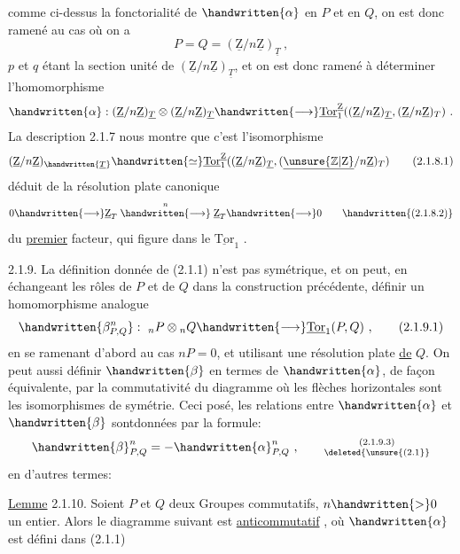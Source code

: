 comme ci-dessus la fonctorialité de $\handwritten{\alpha}$ en $P$ et en $Q$, on est donc ramené au cas où on a 
\[
P=Q=(\underline{\mathrm Z}/n\underline{\mathrm Z})_{\underline{T}}\ ,
\]
$p$ et $q$ étant la section unité de $(\underline{\mathrm Z}/n\underline{\mathrm Z})_{\underline{T}}$, et on est donc ramené à déterminer l'homomorphisme
\[
\handwritten{\alpha}:(\underline{\mathrm Z}/n\underline{\mathrm Z})_{\underline{T}}\otimes(\underline{\mathrm Z}/n\underline{\mathrm Z})_{\underline{T}}\handwritten{\longrightarrow}\underline{\mathrm{Tor}}_1^{\underline{\mathrm Z}}((\underline{\mathrm Z}/n\underline{\mathrm Z})_{\underline{T}},(\underline{\mathrm Z}/n\underline{\mathrm Z})_T)\ .
\]
La description 2.1.7 nous montre que c'est l'isomorphisme
\[
(\underline{\mathrm Z}/n\underline{\mathrm Z})_{\handwritten{\underline T}}\handwritten{\simeq}\underline{\mathrm{Tor}}_1^{\underline{\mathrm Z}}((\underline{\mathrm Z}/n\underline{\mathrm Z})_{\underline{T}},(\underline{\unsure{\mathbb Z|\mathrm Z}}/n\underline{\mathrm Z})_T)\tag*{(2.1.8.1)}
\]
déduit de la résolution plate canonique
\[
0\handwritten{\longrightarrow}\underline{\mathrm Z}_T\mathrel{\mathop{\handwritten{\longrightarrow}}\limits^{n}}\underline{\mathrm Z}_T\handwritten{\longrightarrow}0\tag*{\handwritten{(2.1.8.2)}}
\]
du \uline{premier} facteur,  qui figure dans le $\underline{\mathrm{Tor}}_1$ .

2.1.9. La définition donnée de (2.1.1) n'est pas symétrique, et on peut, en échangeant les rôles de $P$ et de $Q$ dans la construction précédente, définir un homomorphisme analogue
\[
\handwritten{\beta^n_{P,Q}}:\ {}_nP\otimes{}_nQ\handwritten{\longrightarrow}\underline{\mathrm{Tor}}_1(P,Q)\ ,\tag*{(2.1.9.1)}
\]
en se ramenant d'abord au cas $nP=0$, et utilisant une résolution plate \uline{de} $Q$. On peut aussi définir $\handwritten{\beta}$ en termes de $\handwritten{\alpha}$, de façon équivalente, par la commutativité du diagramme
où les flèches horizontales sont les isomorphismes de symétrie. Ceci posé, les relations entre $\handwritten{\alpha}$ et $\handwritten{\beta}$ sont\handwritten{/}données par la formule:
\[
\handwritten{\beta}^{n}_{P,Q}=-{\handwritten{\alpha}}^{n}_{P,Q}\ ,\tag*{\(\substack{\text{(2.1.9.3)}\\\deleted{\text{\unsure{(2.1}}}}\)}
\]
en d'autres termes:

\uline{Lemme} 2.1.10. Soient $P$ et $Q$ deux Groupes commutatifs, $n\handwritten{>}0$ un entier. Alors le diagramme suivant est \uline{anticommutatif} , où $\handwritten{\alpha}$ est défini dans (2.1.1)\handwritten{:}
